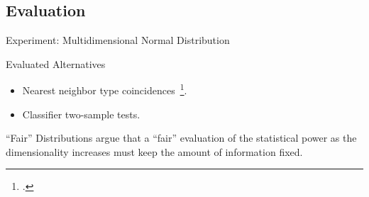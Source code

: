 \documentclass[10pt,compress]{beamer}
\begin{document}
\subsection{Evaluation}

\begin{frame}{Experiment: Multidimensional Normal Distribution}
    \begin{block}{Evaluated Alternatives}
        \smallskip
        \begin{itemize}
            \item Nearest neighbor type coincidences~\footcite{Henze1988, Schilling1986b}.
            \item Classifier two-sample tests.
        \end{itemize}
    \end{block}
    \begin{block}{``Fair'' Distributions}
        \smallskip
        \cite{ramdas2015decreasing} argue that a ``fair'' evaluation of the
        statistical power as the dimensionality increases must keep the
        amount of information fixed.
    \end{block}

\end{frame}
\end{document}
